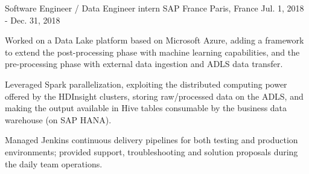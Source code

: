 

\begin{cventries}

  \cventry
    {Software Engineer / Data Engineer intern} %
    {SAP France} %
    {Paris, France} %
    {Jul. 1, 2018 - Dec. 31, 2018} %
    {
      \begin{cvitems} %
        \item {Worked on a Data Lake platform based on Microsoft Azure, adding a framework to extend the post-processing phase with machine learning capabilities, and the pre-processing phase with external data ingestion and ADLS data transfer.}
        \item {Leveraged Spark parallelization, exploiting the distributed computing power offered by the HDInsight clusters, storing raw/processed data on the ADLS, and making the output available in Hive tables consumable by the business data warehouse (on SAP HANA).}
        \item {Managed Jenkins continuous delivery pipelines for both testing and production environments; provided support, troubleshooting and solution proposals during the daily team operations.}
      \end{cvitems}
    }
\end{cventries}
